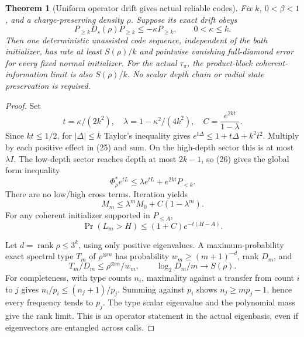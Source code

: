 \documentclass[11pt]{article}
\newtheorem{theorem}{Theorem}[section]
\newcommand{\rank}{\operatorname{rank}}
\begin{document}
\begin{theorem}[Uniform operator drift gives actual reliable codes]
\label{thm:operatorcode}
Fix $k$, $0<\beta<1$, and a charge-preserving density $\rho$.
Suppose its exact drift obeys
\[
 P_{\ge k}D_s(\rho)P_{\ge k}\le-\kappa P_{\ge k},
 \qquad0<\kappa\le k.
 \tag{27}
\]
Then one deterministic unassisted code sequence, independent of the bath
initializer, has rate at least $S(\rho)/k$ and pointwise vanishing
full-diamond error for every fixed normal initializer.
For the actual $\tau_\pi$, the product-block coherent-information limit
is also $S(\rho)/k$. No scalar depth chain or radial state preservation
is required.
\end{theorem}
\begin{proof}
Set
\[
 t=\kappa/(2k^2),\quad
 \lambda=1-\kappa^2/(4k^2),\quad
 C=\frac{e^{2kt}}{1-\lambda}.
 \tag{28}
\]
Since $kt\le1/2$, for $|\Delta|\le k$ Taylor's inequality gives
$e^{t\Delta}\le1+t\Delta+k^2t^2$.
Multiply by each positive effect in (25) and sum. On the high-depth sector
this is at most $\lambda I$. The low-depth sector reaches depth at most
$2k-1$, so (26) gives the global form inequality
\[
 \Phi_\rho^*e^{tL}
 \le\lambda e^{tL}+e^{2kt}P_{<k}.
 \tag{29}
\]
There are no low/high cross terms. Iteration yields
\[
 M_m\le\lambda^m M_0+C(1-\lambda^m).
 \tag{30}
\]
For any coherent initializer supported in $P_{\le A}$,
\[
 \Pr(L_m>H)\le(1+C)e^{-t(H-A)}.
 \tag{31}
\]

Let $d=\rank\rho\le3^k$, using only positive eigenvalues. A
maximum-probability exact spectral type $T_m$ of $\rho^{\otimes m}$
has probability $w_m\ge(m+1)^{-d}$, rank $D_m$, and
\[
 T_m/D_m\le\rho^{\otimes m}/w_m,\qquad
 \log_2D_m/m\longrightarrow S(\rho).
 \tag{32}
\]
For completeness, with type counts $n_i$, maximality against a transfer
from count $i$ to $j$ gives
$n_i/p_i\le(n_j+1)/p_j$. Summing against $p_i$ shows
$n_j\ge mp_j-1$, hence every frequency tends to $p_j$.
The type scalar eigenvalue and the polynomial mass give the rank limit.
This is an operator statement in the actual eigenbasis, even if eigenvectors
are entangled across calls.


\end{proof}
\end{document}
